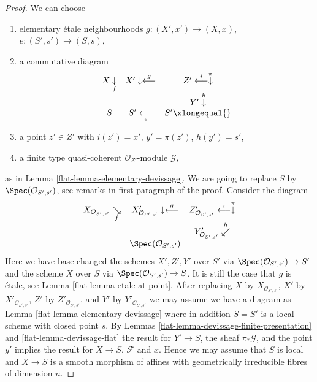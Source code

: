 \begin{proof}
\medskip\noindent
We can choose
\begin{enumerate}
\item elementary \'etale neighbourhoods $g : (X', x') \to (X, x)$,
$e : (S', s') \to (S, s)$,
\item a commutative diagram
$$
\begin{array}{ccc}X \underset{f}{\downarrow} & X' \downarrow\overset{g}{\longleftarrow} & Z' \overset{i}{\longleftarrow}\overset{\pi}{\downarrow} \\  &  & Y' \overset{h}{\downarrow} \\ S & S' \underset{e}{\longleftarrow} & S' \xlongequal{}\end{array}
$$
\item a point $z' \in Z'$ with $i(z') = x'$, $y' = \pi(z')$, $h(y') = s'$,
\item a finite type quasi-coherent $\mathcal{O}_{Z'}$-module $\mathcal{G}$,
\end{enumerate}
as in
Lemma \ref{flat-lemma-elementary-devissage}.
We are going to replace $S$ by $\Spec(\mathcal{O}_{S', s'})$, see
remarks in first paragraph of the proof. Consider the diagram
$$
\begin{array}{ccc}X_{\mathcal{O}_{S', s'}} \underset{f}{\searrow} & X'_{\mathcal{O}_{S', s'}} \downarrow\overset{g}{\longleftarrow} & Z'_{\mathcal{O}_{S', s'}} \overset{i}{\longleftarrow}\overset{\pi}{\downarrow} \\  &  & Y'_{\mathcal{O}_{S', s'}} \overset{h}{\swarrow} \\  & \Spec(\mathcal{O}_{S', s'}) & \end{array}
$$
Here we have base changed the schemes $X', Z', Y'$ over $S'$ via
$\Spec(\mathcal{O}_{S', s'}) \to S'$ and the scheme $X$ over $S$ via
$\Spec(\mathcal{O}_{S', s'}) \to S$. It is still the case that
$g$ is \'etale, see
Lemma \ref{flat-lemma-etale-at-point}.
After replacing $X$ by $X_{\mathcal{O}_{S', s'}}$,
$X'$ by $X'_{\mathcal{O}_{S', s'}}$,
$Z'$ by $Z'_{\mathcal{O}_{S', s'}}$, and
$Y'$ by $Y'_{\mathcal{O}_{S', s'}}$
we may assume we have a diagram as
Lemma \ref{flat-lemma-elementary-devissage}
where in addition $S = S'$ is a local scheme with closed point $s$. By
Lemmas \ref{flat-lemma-devissage-finite-presentation} and
\ref{flat-lemma-devissage-flat}
the result for $Y' \to S$, the sheaf $\pi_*\mathcal{G}$, and the
point $y'$ implies the result for $X \to S$, $\mathcal{F}$ and $x$.
Hence we may assume that $S$ is local and $X \to S$ is a smooth morphism
of affines with geometrically irreducible fibres of dimension $n$.


\end{proof}
